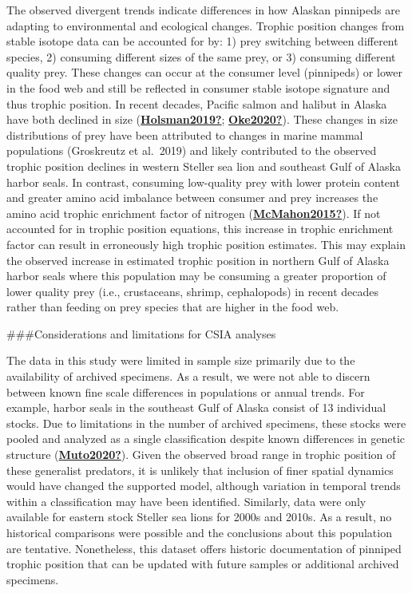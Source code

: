 \documentclass [11pt, proquest] {uwthesis}[2015/03/03]
\begin{document}
The observed divergent trends indicate differences in how Alaskan pinnipeds are adapting to environmental and ecological changes. Trophic position changes from stable isotope data can be accounted for by: 1) prey switching between different species, 2) consuming different sizes of the same prey, or 3) consuming different quality prey. These changes can occur at the consumer level (pinnipeds) or lower in the food web and still be reflected in consumer stable isotope signature and thus trophic position. In recent decades, Pacific salmon and halibut in Alaska have both declined in size (\protect\hyperlink{ref-Holsman2019}{\textbf{Holsman2019?}}; \protect\hyperlink{ref-Oke2020}{\textbf{Oke2020?}}). These changes in size distributions of prey have been attributed to changes in marine mammal populations (Groskreutz et al.~2019) and likely contributed to the observed trophic position declines in western Steller sea lion and southeast Gulf of Alaska harbor seals. In contrast, consuming low-quality prey with lower protein content and greater amino acid imbalance between consumer and prey increases the amino acid trophic enrichment factor of nitrogen (\protect\hyperlink{ref-McMahon2015}{\textbf{McMahon2015?}}). If not accounted for in trophic position equations, this increase in trophic enrichment factor can result in erroneously high trophic position estimates. This may explain the observed increase in estimated trophic position in northern Gulf of Alaska harbor seals where this population may be consuming a greater proportion of lower quality prey (i.e., crustaceans, shrimp, cephalopods) in recent decades rather than feeding on prey species that are higher in the food web.

\#\#\#Considerations and limitations for CSIA analyses

The data in this study were limited in sample size primarily due to the availability of archived specimens. As a result, we were not able to discern between known fine scale differences in populations or annual trends. For example, harbor seals in the southeast Gulf of Alaska consist of 13 individual stocks. Due to limitations in the number of archived specimens, these stocks were pooled and analyzed as a single classification despite known differences in genetic structure (\protect\hyperlink{ref-Muto2020}{\textbf{Muto2020?}}). Given the observed broad range in trophic position of these generalist predators, it is unlikely that inclusion of finer spatial dynamics would have changed the supported model, although variation in temporal trends within a classification may have been identified. Similarly, data were only available for eastern stock Steller sea lions for 2000s and 2010s. As a result, no historical comparisons were possible and the conclusions about this population are tentative. Nonetheless, this dataset offers historic documentation of pinniped trophic position that can be updated with future samples or additional archived specimens.
\end{document}

